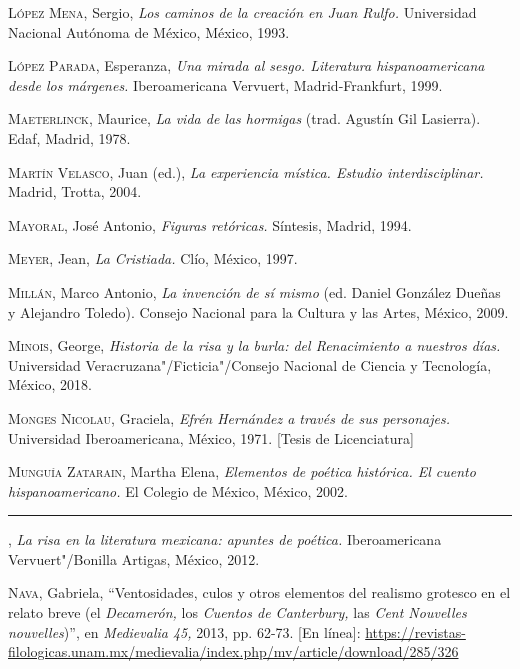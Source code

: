 \documentclass[14pt,twoside,final]{extbook} %
\begin{document}
\textsc{López Mena}, Sergio, \emph{Los caminos de la creación en Juan Rulfo.} Universidad Nacional Autónoma de México, México, 1993.\label{bib:lopezmena1993}

\textsc{López Parada}, Esperanza, \emph{Una mirada al sesgo. Literatura hispanoamericana desde los márgenes.} Iberoamericana Vervuert, Madrid-Frankfurt, 1999.\label{bib:lopezparada1999}

\textsc{Maeterlinck}, Maurice, \emph{La vida de las hormigas} (trad. Agustín Gil Lasierra). Edaf, Madrid, 1978.\label{bib:maeterlinck1978}

\textsc{Martín Velasco}, Juan (ed.), \emph{La experiencia mística. Estudio interdisciplinar.} Madrid, Trotta, 2004.\label{bib:martin2004}

\textsc{Mayoral}, José Antonio, \emph{Figuras retóricas.} Síntesis, Madrid, 1994.\label{bib:mayoral1994}

\textsc{Meyer}, Jean, \emph{La Cristiada.} Clío, México, 1997.\label{bib:meyer1997}

\textsc{Millán}, Marco Antonio, \emph{La invención de sí mismo} (ed. Daniel González Dueñas y Alejandro Toledo). Consejo Nacional para la Cultura y las Artes, México, 2009.\label{bib:millan2009}

\textsc{Minois}, George, \emph{Historia de la risa y la burla: del Renacimiento a nuestros días.} Universidad Veracruzana"/Ficticia"/Consejo Nacional de Ciencia y Tecnología, México, 2018.\label{bib:minois2018}

\textsc{Monges Nicolau}, Graciela, \emph{Efrén Hernández a través de sus personajes.} Universidad Iberoamericana, México, 1971. [Tesis de Licenciatura]\label{bib:monges1971}

\textsc{Munguía Zatarain}, Martha Elena, \emph{Elementos de poética histórica. El cuento hispanoamericano.} El Colegio de México, México, 2002.\label{bib:munguia2002}

\rule{1cm}{0.4pt}, \emph{La risa en la literatura mexicana: apuntes de poética.} Iberoamericana Vervuert"/Bonilla Artigas, México, 2012.\label{bib:munguia2012}

\textsc{Nava}, Gabriela, ``Ventosidades, culos y otros elementos del realismo grotesco en el relato breve (el \emph{Decamerón,} los \emph{Cuentos de Canterbury,} las \emph{Cent Nouvelles nouvelles})'', en \emph{Medievalia 45,} 2013, pp. 62-73. [En línea]: \url{https://revistas-filologicas.unam.mx/medievalia/index.php/mv/article/download/285/326}\label{bib:nava2013}
\end{document}
